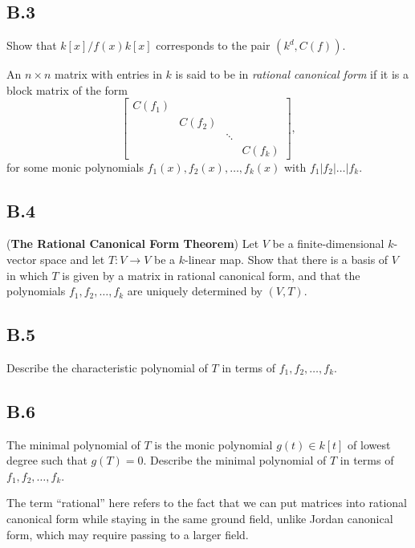 \documentclass[lang=cn,11pt]{template}
\begin{document}
\subsection*{B.3} Show that \( k[x] / f(x)k[x] \) corresponds to the pair \( (k^d, C(f)) \).

\begin{definition}
An \( n \times n \) matrix with entries in \( k \) is said to be in \textit{rational canonical form} if it is a block matrix of the form
\[
\begin{bmatrix} C(f_1) & & \\ & C(f_2) & \\ & & \ddots & \\ & & & C(f_k) \end{bmatrix},
\]
for some monic polynomials \( f_1(x), f_2(x), \dots, f_k(x) \) with \( f_1 | f_2 | \dots | f_k \).
\end{definition}

\subsection*{B.4} (\textbf{The Rational Canonical Form Theorem}) Let \( V \) be a finite-dimensional \( k \)-vector space and let \( T : V \to V \) be a \( k \)-linear map. Show that there is a basis of \( V \) in which \( T \) is given by a matrix in rational canonical form, and that the polynomials \( f_1, f_2, \dots, f_k \) are uniquely determined by \( (V, T) \).

\subsection*{B.5} Describe the characteristic polynomial of \( T \) in terms of \( f_1, f_2, \dots, f_k \).

\subsection*{B.6} The minimal polynomial of \( T \) is the monic polynomial \( g(t) \in k[t] \) of lowest degree such that \( g(T) = 0 \). Describe the minimal polynomial of \( T \) in terms of \( f_1, f_2, \dots, f_k \).

\begin{remark}
The term “rational” here refers to the fact that we can put matrices into rational canonical form while staying in the same ground field, unlike Jordan canonical form, which may require passing to a larger field.
\end{remark}
\end{document}
